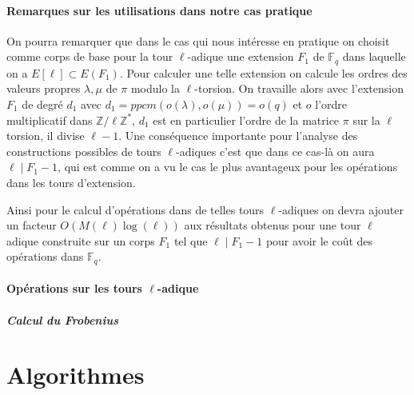 \documentclass[10pt,a4paper]{book}
\theoremstyle{plain}
\theoremstyle{definition}
\theoremstyle{definition}
\theoremstyle{definition}
\theoremstyle{definition}
\theoremstyle{remark}
\theoremstyle{remark}
\theoremstyle{definition}
\begin{document}
\subsubsection{Remarques sur les utilisations dans notre cas pratique}
On pourra remarquer que dans le cas qui nous intéresse en pratique on choisit comme corps de base pour la tour $\ell$-adique une extension $F_1$ de $\mathbb{F}_q$ dans laquelle on a $E[\ell] \subset E(F_1)$. Pour calculer une telle extension on calcule les ordres des valeurs propres $\lambda, \mu$ de $\pi$ modulo la $\ell$-torsion. On travaille alors avec l'extension $F_1$ de degré $d_1$ avec $d_1=ppcm(o(\lambda),o(\mu))=o(q)$ et $o$ l'ordre multiplicatif dans $\mathbb{Z}/\ell\mathbb{Z}^*$, $d_1$ est en particulier l'ordre de la matrice $\pi$ sur la $\ell$ torsion, il divise $\ell-1$. Une conséquence importante pour l'analyse des constructions possibles de tours $\ell$-adiques c'est que dans ce cas-là on aura $\ell \mid F_1-1$, qui est comme on a vu le cas le plus avantageux pour les opérations dans les tours d'extension. 

Ainsi pour le calcul d'opérations dans de telles tours $\ell$-adiques on devra ajouter un facteur $O(M(\ell)\log(\ell))$ aux résultats obtenus pour une tour $\ell$ adique construite sur un corps $F_1$ tel que $\ell \mid F_1-1$ pour avoir le coût des opérations dans $\mathbb{F}_q$.


\subsubsection{Opérations sur les tours $\ell$-adique}


\paragraph{Calcul du Frobenius}









\appendix
\chapter{Algorithmes}
\end{document}

